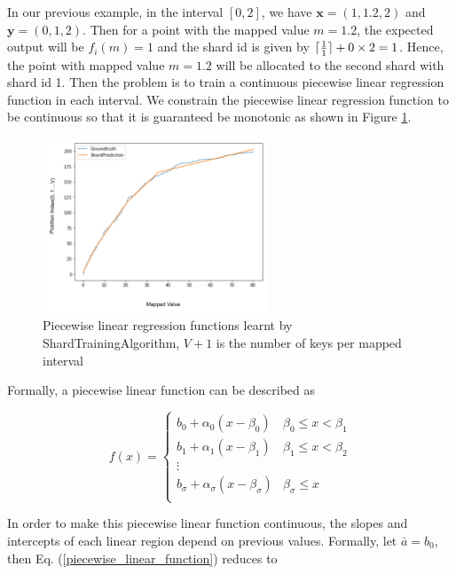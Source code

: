 \begin{mscexample}
	In our previous example, in the interval $[0,2]$, we have $\boldsymbol{x}=(1,1.2,2)$ and $\boldsymbol{y}=(0,1,2)$. Then for a point with the mapped value $m=1.2$, the expected output will be $f_i(m)=1$ and the shard id is given by $\lceil\frac{1}{1}\rceil+0\times 2=1$. Hence, the point with mapped value $m=1.2$ will be allocated to the second shard with shard id 1. Then the problem is to train a continuous piecewise linear regression function in each interval. We constrain the piecewise linear regression function to be continuous so that it is guaranteed be monotonic as shown in Figure \ref{shardPrediction}.
\end{mscexample}

\begin{figure}[t]
    \centering
	\includegraphics[width=0.6\textwidth]{graphs/implementation/shardPrediction.pdf}
    \caption{Piecewise linear regression functions learnt by ShardTrainingAlgorithm, $V+1$ is the number of keys per mapped interval}
    \label{shardPrediction}
\end{figure}

Formally, a piecewise linear function can be described as 

\begin{equation}
\label{piecewise_linear_function}
	f(x)= \begin{cases} 
      b_0+\alpha_0(x-\beta_0) & \beta_0\leq x < \beta_1 \\
      b_1+\alpha_1(x-\beta_1) &  \beta_1\leq x < \beta_2 \\
      \vdots \\
      b_\sigma+\alpha_\sigma(x-\beta_\sigma) &  \beta_\sigma\leq x \\
   \end{cases}
\end{equation}

In order to make this piecewise linear function continuous, the slopes and intercepts of each linear region depend on previous values. Formally, let $\bar{a}=b_0$, then Eq. (\ref{piecewise_linear_function}) reduces to

